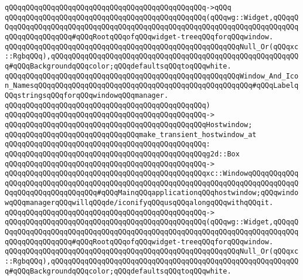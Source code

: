 \verb|qQQqqQQqqQQqqQQqqQQqqQQqqQQqqQQqqQQqqQQqqQQqqQQq->qQQq|\newline
\verb|qQQqqQQqqQQqqQQqqQQqqQQqqQQqqQQqqQQqqQQqqQQqqQQq(qQQqwg::Widget,qQQqqQQqqQQqqQQqqQQqqQQqqQQqqQQqqQQqqQQqqQQqqQQqqQQqqQQqqQQqqQQqqQQqqQQqqQQqqQQqqQQqqQQqqQQq#qQQqRootqQQqofqQQqwidget-treeqQQqforqQQqwindow.|\newline
\verb|qQQqqQQqqQQqqQQqqQQqqQQqqQQqqQQqqQQqqQQqqQQqqQQqqQQqqQQqNull_Or(qQQqxc::RgbqQQq),qQQqqQQqqQQqqQQqqQQqqQQqqQQqqQQqqQQqqQQqqQQqqQQqqQQqqQQqqQQq#qQQqBackgroundqQQqcolor;qQQqdefaultsqQQqtoqQQqwhite.|\newline
\verb|qQQqqQQqqQQqqQQqqQQqqQQqqQQqqQQqqQQqqQQqqQQqqQQqqQQqqQQqWindow_And_Icon_NamesqQQqqQQqqQQqqQQqqQQqqQQqqQQqqQQqqQQqqQQqqQQqqQQqqQQq#qQQqLabelqQQqstringsqQQqforqQQqwindowqQQqmanager.|\newline
\verb|qQQqqQQqqQQqqQQqqQQqqQQqqQQqqQQqqQQqqQQqqQQqqQQq)|\newline
\verb|qQQqqQQqqQQqqQQqqQQqqQQqqQQqqQQqqQQqqQQqqQQqqQQq->|\newline
\verb|qQQqqQQqqQQqqQQqqQQqqQQqqQQqqQQqqQQqqQQqqQQqqQQqHostwindow;|\newline
\newline
\verb|qQQqqQQqqQQqqQQqqQQqqQQqqQQqqQQqmake_transient_hostwindow_at|\newline
\verb|qQQqqQQqqQQqqQQqqQQqqQQqqQQqqQQqqQQqqQQqqQQqqQQq:|\newline
\verb|qQQqqQQqqQQqqQQqqQQqqQQqqQQqqQQqqQQqqQQqqQQqqQQqg2d::Box|\newline
\verb|qQQqqQQqqQQqqQQqqQQqqQQqqQQqqQQqqQQqqQQqqQQqqQQq->|\newline
\verb|qQQqqQQqqQQqqQQqqQQqqQQqqQQqqQQqqQQqqQQqqQQqqQQqxc::WindowqQQqqQQqqQQqqQQqqQQqqQQqqQQqqQQqqQQqqQQqqQQqqQQqqQQqqQQqqQQqqQQqqQQqqQQqqQQqqQQqqQQqqQQqqQQqqQQqqQQqqQQq#qQQqMainqQQqapplicationqQQqhostwindow;qQQqwindowqQQqmanagerqQQqwillqQQqde/iconifyqQQqusqQQqalongqQQqwithqQQqit.|\newline
\verb|qQQqqQQqqQQqqQQqqQQqqQQqqQQqqQQqqQQqqQQqqQQqqQQq->|\newline
\verb|qQQqqQQqqQQqqQQqqQQqqQQqqQQqqQQqqQQqqQQqqQQqqQQq(qQQqwg::Widget,qQQqqQQqqQQqqQQqqQQqqQQqqQQqqQQqqQQqqQQqqQQqqQQqqQQqqQQqqQQqqQQqqQQqqQQqqQQqqQQqqQQqqQQqqQQq#qQQqRootqQQqofqQQqwidget-treeqQQqforqQQqwindow.|\newline
\verb|qQQqqQQqqQQqqQQqqQQqqQQqqQQqqQQqqQQqqQQqqQQqqQQqqQQqqQQqNull_Or(qQQqxc::RgbqQQq),qQQqqQQqqQQqqQQqqQQqqQQqqQQqqQQqqQQqqQQqqQQqqQQqqQQqqQQqqQQq#qQQqBackgroundqQQqcolor;qQQqdefaultsqQQqtoqQQqwhite.|\newline
